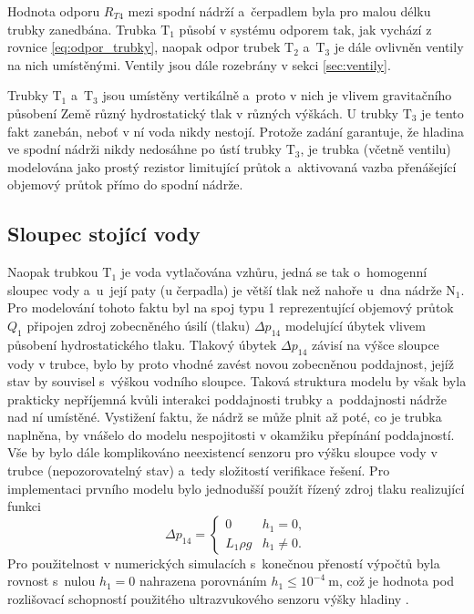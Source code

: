 \documentclass[conference]{IEEEtran}
\begin{document}
Hodnota odporu $R_{T4}$ mezi spodní nádrží a~čerpadlem byla pro malou délku trubky zanedbána.
Trubka $\text{T}_1$ působí v systému odporem tak, jak vychází z rovnice \eqref{eq:odpor_trubky},
naopak odpor trubek $\text{T}_2$ a~$\text{T}_3$ je dále ovlivněn ventily na nich umístěnými.
Ventily jsou dále rozebrány v sekci \ref{sec:ventily}.

Trubky $\text{T}_1$ a~$\text{T}_3$ jsou umístěny vertikálně a~proto v nich je vlivem gravitačního působení Země různý hydrostatický
tlak v různých výškách.
U trubky $\text{T}_3$ je tento fakt zanebán, neboť v ní voda nikdy nestojí. Protože zadání garantuje, že hladina ve spodní nádrži
nikdy nedosáhne po ústí trubky $\text{T}_3$, je trubka (včetně ventilu) modelována jako prostý rezistor limitující průtok a~aktivovaná vazba
přenášející objemový průtok přímo do spodní nádrže.

\subsection{Sloupec stojící vody}
\label{sec:sloupec_vody}
Naopak trubkou $\text{T}_1$ je voda vytlačována vzhůru, jedná se tak o~homogenní sloupec vody a~u~její paty (u čerpadla)
je větší tlak než nahoře u~dna nádrže $\text{N}_1$.
Pro modelování tohoto faktu byl na spoj typu 1 reprezentující objemový průtok $Q_1$ připojen zdroj zobecněného úsilí (tlaku)
$\Delta p_{14}$ modelující úbytek vlivem působení hydrostatického tlaku. Tlakový úbytek $\Delta p_{14}$ závisí na výšce sloupce vody
v trubce, bylo by proto vhodné zavést novou zobecněnou poddajnost, jejíž stav by souvisel s~výškou vodního sloupce.
Taková struktura modelu by však byla prakticky nepříjemná kvůli interakci poddajnosti trubky a~poddajnosti nádrže nad ní umístěné.
Vystižení faktu, že nádrž se může plnit až poté, co je trubka naplněna, by vnášelo do modelu nespojitosti v okamžiku přepínání poddajností.
Vše by bylo dále komplikováno neexistencí senzoru pro výšku sloupce vody v trubce (nepozorovatelný stav) a~tedy složitostí verifikace řešení.
Pro implementaci prvního modelu bylo jednodušší použít řízený zdroj tlaku realizující funkci
\begin{equation}
    \Delta p_{14} = \begin{cases}
        0 & h_1 = 0, \\
        L_1 \rho g & h_1 \neq 0.
    \end{cases}
\end{equation}
Pro použitelnost v numerických simulacích s~konečnou přeností výpočtů byla
rovnost s~nulou $h_1 = 0$ nahrazena porovnáním $h_1 \le 10^{-4}~\si{\metre}$, což je hodnota pod rozlišovací schopností
použitého ultrazvukového senzoru výšky hladiny \cite{hladinomer}.
\end{document}

